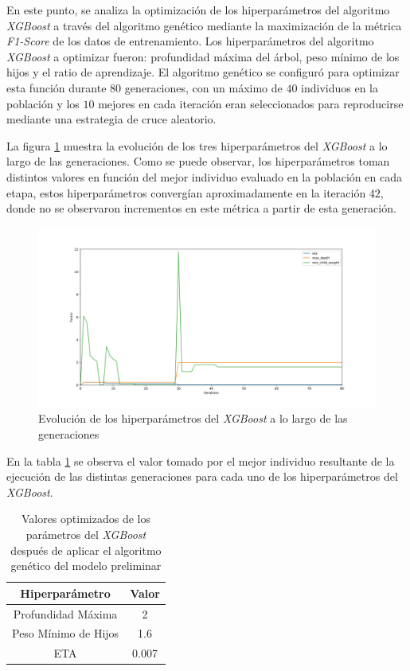 En este punto, se analiza la optimización de los hiperparámetros del algoritmo \textit{XGBoost} a través del algoritmo genético mediante la maximización de la métrica \textit{F1-Score} de los datos de entrenamiento. Los hiperparámetros del algoritmo \textit{XGBoost} a optimizar fueron: profundidad máxima del árbol, peso mínimo de los hijos y el ratio de aprendizaje. El algoritmo genético se configuró para optimizar esta función durante $80$ generaciones, con un máximo de $40$ individuos en la población y los $10$ mejores en cada iteración eran seleccionados para reproducirse mediante una estrategia de cruce aleatorio.

La figura \ref{EvolucionHiperparametrosImage} muestra la evolución de  los tres hiperparámetros del \textit{XGBoost} a lo largo de las generaciones. Como se puede observar, los hiperparámetros toman distintos valores en función del mejor individuo evaluado en la población en cada etapa, estos hiperparámetros convergían aproximadamente en la iteración $42$, donde no se observaron incrementos en este métrica a partir de esta generación.

\begin{figure}[H]
	\centering
	\includegraphics[width=14cm]{Figures/1stPaper/EvolutionH.png}
	\caption{Evolución de los hiperparámetros del \textit{XGBoost} a lo largo de las generaciones}
	\label{EvolucionHiperparametrosImage}
\end{figure}

En la tabla \ref{BestGASolutionTable} se observa el valor tomado por el mejor individuo resultante de la ejecución de las distintas generaciones para cada uno de los hiperparámetros del \textit{XGBoost}. 

\begin{table}[h]
	\centering
	\begin{tabular}{ |c|c| } 
		\hline
		\textbf{Hiperparámetro} & \textbf{Valor}\\
		\hline
		Profundidad Máxima & 2 \\
		Peso Mínimo de Hijos & 1.6 \\ 
		ETA & 0.007 \\
		\hline
	\end{tabular}
	\caption{Valores optimizados de los parámetros del \textit{XGBoost} después de aplicar el algoritmo genético del modelo preliminar}
	\label{BestGASolutionTable}
\end{table}

